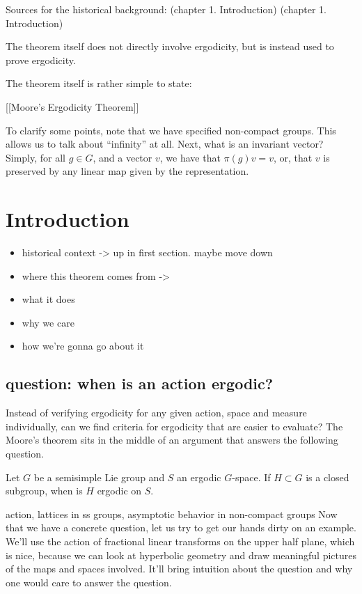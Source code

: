 \documentclass[
]{article}
\begin{document}
Sources for the historical background: \cite{mackey74}(chapter 1.
Introduction) \cite{Zimmer84}(chapter 1. Introduction)

The theorem itself does not directly involve ergodicity, but is instead
used to prove ergodicity.

The theorem itself is rather simple to state:

{[}{[}Moore's Ergodicity Theorem{]}{]}

To clarify some points, note that we have specified non-compact groups.
This allows us to talk about ``infinity'' at all. Next, what is an
invariant vector? Simply, for all \(g\in G\), and a vector \(v\), we
have that \(\pi(g)v = v\), or, that \(v\) is preserved by any linear map
given by the representation.

\hypertarget{introduction}{%
\section{Introduction}\label{introduction}}


\begin{itemize}
  \item historical context -\textgreater{} up in first section. maybe move down
  \item where this theorem comes from -\textgreater{} \cite{howe79}
  \item what it does
  \item why we care
  \item how we're gonna go about it
\end{itemize}

\hypertarget{question-when-is-an-action-ergodic}{%
\subsection{question: when is an action
ergodic?}\label{question-when-is-an-action-ergodic}}

Instead of verifying ergodicity for any given action, space and measure
individually, can we find criteria for ergodicity that are easier to
evaluate? The Moore's theorem sits in the middle of an argument that
answers the following question.

Let \(G\) be a semisimple Lie group and \(S\) an ergodic \(G\)-space. If
\(H\subset G\) is a closed subgroup, when is \(H\) ergodic on \(S\).


action, lattices in ss groups, asymptotic behavior in non-compact groups
\cite{howe79}
Now that we have a concrete question, let us try to get our hands dirty
on an example. We'll use the action of fractional linear transforms on
the upper half plane, which is nice, because we can look at hyperbolic
geometry and draw meaningful pictures of the maps and spaces involved.
It'll bring intuition about the question and why one would care to
answer the question.
\end{document}
